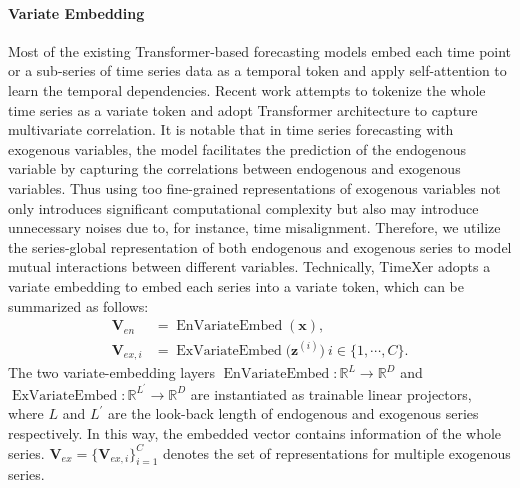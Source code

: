 \documentclass[nohyperref]{article}
\theoremstyle{plain}
\theoremstyle{definition}
\theoremstyle{remark}
\begin{document}
\paragraph{Variate Embedding}
Most of the existing Transformer-based forecasting models embed each time point or a sub-series of time series data as a temporal token and apply self-attention to learn the temporal dependencies. Recent work \cite{liu2023itransformer} attempts to tokenize the whole time series as a variate token and adopt Transformer architecture to capture multivariate correlation. It is notable that in time series forecasting with exogenous variables, the model facilitates the prediction of the endogenous variable by capturing the correlations between endogenous and exogenous variables. Thus using too fine-grained representations of exogenous variables not only introduces significant computational complexity but also may introduce unnecessary noises due to, for instance, time misalignment.
Therefore, we utilize the series-global representation of both endogenous and exogenous series to model mutual interactions between different variables. Technically, TimeXer adopts a variate embedding to embed each series into a variate token, which can be summarized as follows: 
\begin{equation}
    \begin{aligned}
        \mathbf{V}_{en} &= \operatorname{EnVariateEmbed} \left(\mathbf{x}\right), \\
        \mathbf{V}_{ex,i} &= \operatorname{ExVariateEmbed} \big(\mathbf{z}^{(i)}\big)\ \text{$i\in\{1,\cdots, C\}$}.
    \end{aligned}
\end{equation}
The two variate-embedding layers $\operatorname{EnVariateEmbed}: \mathbb{R}^L \to \mathbb{R}^D$ and $\operatorname{ExVariateEmbed}: \mathbb{R}^{L^\prime} \to \mathbb{R}^D$ are instantiated as trainable linear projectors, where $L$ and $L^\prime$ are the look-back length of endogenous and exogenous series respectively. In this way, the embedded vector contains information of the whole series. $\mathbf{V}_{ex}=\{\mathbf{V}_{ex,i}\}_{i=1}^{C}$ denotes the set of representations for multiple exogenous series.
\end{document}
